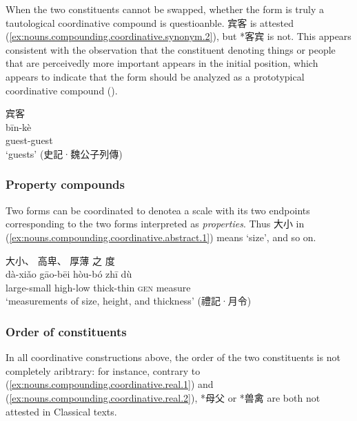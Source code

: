 \documentclass[UTF8, a4paper, oneside, scheme=plain, 12pt]{ctexrep}
\newcommand{\translate}[1]{`#1'}
\newcommand*{\category}[1]{\textsc{#1}}
\begin{document}
When the two constituents cannot be swapped, whether the form is truly a tautological coordinative compound is questioanble.
宾客 is attested (\ref{ex:nouns.compounding.coordinative.synonym.2}), but *客宾 is not. 
This appears consistent with the observation that the constituent denoting things or people that are perceivedly more important appears in the initial position,
which appears to indicate that the form should be analyzed as a prototypical coordinative compound ().

\begin{exe}
    \ex\label{ex:nouns.compounding.coordinative.synonym.2}
    \glll 宾客 \\
    bīn-kè \\
    guest-guest \\
    \glt\translate{guests} \hfill (史記·魏公子列傳)
\end{exe}

\subsubsection{Property compounds}

Two forms can be coordinated to denotea a scale with its two endpoints corresponding to the two forms interpreted as \emph{properties}.
Thus 大小 in (\ref{ex:nouns.compounding.coordinative.abstract.1}) means \translate{size}, and so on.

\begin{exe}
    \ex\label{ex:nouns.compounding.coordinative.abstract.1}
    \glll
    大小、 高卑、 厚薄 之 度 \\
    dà-xiǎo gāo-bēi hòu-bó zhī dù \\
    large-small high-low thick-thin \category{gen} measure \\
    \glt\translate{measurements of size, height, and thickness} \hfill (禮記·月令)
\end{exe}

\subsubsection{Order of constituents}

In all coordinative constructions above, 
the order of the two constituents is not completely aribtrary:
for instance, contrary to (\ref{ex:nouns.compounding.coordinative.real.1}) and (\ref{ex:nouns.compounding.coordinative.real.2}),
*母父 or *兽禽 are both not attested in Classical texts.
\end{document}
